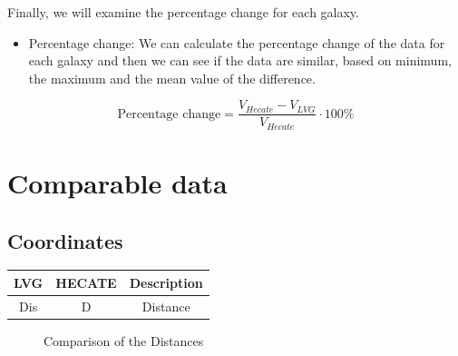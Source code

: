 \documentclass[
]{article}
\providecommand{\tightlist}{%
  \setlength{\itemsep}{0pt}\setlength{\parskip}{0pt}}\usepackage{longtable,booktabs,array}
\begin{document}
Finally, we will examine the percentage change for each galaxy.

\begin{itemize}
\tightlist
\item
  Percentage change: We can calculate the percentage change of the data
  for each galaxy and then we can see if the data are similar, based on
  minimum, the maximum and the mean value of the difference.
\end{itemize}

\[\text{Percentage change} = \frac{V_{Hecate} - V_{LVG}}{V_{Hecate}}\cdot 100 \%\]

\section{Comparable data}\label{comparable-data}

\subsection{Coordinates}\label{coordinates}

\begin{longtable}[]{@{}ccc@{}}
\toprule\noalign{}
LVG & HECATE & Description \\
\midrule\noalign{}
\endhead
\bottomrule\noalign{}
\endlastfoot
Dis & D & Distance \\
\end{longtable}

\begin{figure}


\caption{\label{fig-coord-compare}Comparison of the Distances}

\end{figure}%
\end{document}
